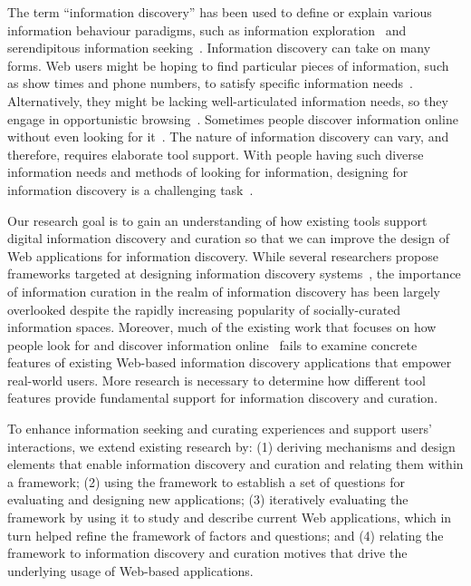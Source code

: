 \documentclass[review]{elsarticle}
\begin{document}
The term ``information discovery'' has been used to define or explain various information behaviour paradigms, such as information exploration~\cite{waterworth1991model} and serendipitous information seeking~\cite{foster2003serendipity}.  
Information discovery can take on many forms. Web users might be hoping to find particular pieces of information, such as show times and phone numbers, to satisfy specific information needs~\cite{proper1999information}. Alternatively, they might be lacking well-articulated information needs, so they engage in opportunistic browsing~\cite{lindley2012s}. Sometimes people discover information online without even looking for it~\cite{bates1986exploratory}. The nature of information discovery can vary, and therefore, requires elaborate tool support. With people having such diverse information needs and methods of looking for information, designing for information discovery is a challenging task~\cite{conaway2010designing, marchionini2006exploratory}.

Our research goal is to gain an understanding of how existing tools support digital information discovery and curation so that we can improve the design of Web applications for information discovery. While several researchers propose frameworks targeted at designing information discovery systems~\cite{proper1999information, kerne2004information}, the importance of information curation in the realm of information discovery has been largely overlooked despite the rapidly increasing popularity of socially-curated information spaces. Moreover, much of the existing work that focuses on how people look for and discover information online~\cite{bates1986exploratory, choo2000information, ellis1989behavioural, kellar2006goal, lindley2012s, morrison2001taxonomic, sellen2002knowledge} fails to examine concrete features of existing Web-based information discovery applications that empower real-world users. More research is necessary to determine how different tool features provide fundamental support for information discovery and curation.

To enhance information seeking and curating experiences and support users' interactions, we extend existing research by: (1) deriving mechanisms and design elements that enable information discovery and curation and relating them within a framework; (2) using the framework to establish a set of questions for evaluating and designing new applications; (3) iteratively evaluating the framework by using it to study and describe current Web applications, which in turn helped refine the framework of factors and questions; and (4) relating the framework to information discovery and curation motives that drive the underlying usage of Web-based applications.
\end{document}
